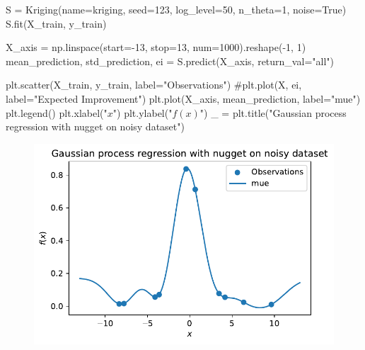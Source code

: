 \documentclass[
  letterpaper,
  DIV=11,
  numbers=noendperiod]{scrreprt}
\newenvironment{Shaded}{\begin{snugshade}}{\end{snugshade}}
\newcommand{\CommentTok}[1]{\textcolor[rgb]{0.37,0.37,0.37}{#1}}
\newcommand{\DecValTok}[1]{\textcolor[rgb]{0.68,0.00,0.00}{#1}}
\newcommand{\NormalTok}[1]{\textcolor[rgb]{0.00,0.23,0.31}{#1}}
\newcommand{\OperatorTok}[1]{\textcolor[rgb]{0.37,0.37,0.37}{#1}}
\newcommand{\StringTok}[1]{\textcolor[rgb]{0.13,0.47,0.30}{#1}}
\newcommand{\VariableTok}[1]{\textcolor[rgb]{0.07,0.07,0.07}{#1}}
\begin{document}
\begin{Shaded}
\begin{Highlighting}[]
\NormalTok{S }\OperatorTok{=}\NormalTok{ Kriging(name}\OperatorTok{=}\StringTok{\textquotesingle{}kriging\textquotesingle{}}\NormalTok{,}
\NormalTok{            seed}\OperatorTok{=}\DecValTok{123}\NormalTok{,}
\NormalTok{            log\_level}\OperatorTok{=}\DecValTok{50}\NormalTok{,}
\NormalTok{            n\_theta}\OperatorTok{=}\DecValTok{1}\NormalTok{,}
\NormalTok{            noise}\OperatorTok{=}\VariableTok{True}\NormalTok{)}
\NormalTok{S.fit(X\_train, y\_train)}

\NormalTok{X\_axis }\OperatorTok{=}\NormalTok{ np.linspace(start}\OperatorTok{={-}}\DecValTok{13}\NormalTok{, stop}\OperatorTok{=}\DecValTok{13}\NormalTok{, num}\OperatorTok{=}\DecValTok{1000}\NormalTok{).reshape(}\OperatorTok{{-}}\DecValTok{1}\NormalTok{, }\DecValTok{1}\NormalTok{)}
\NormalTok{mean\_prediction, std\_prediction, ei }\OperatorTok{=}\NormalTok{ S.predict(X\_axis, return\_val}\OperatorTok{=}\StringTok{"all"}\NormalTok{)}

\NormalTok{plt.scatter(X\_train, y\_train, label}\OperatorTok{=}\StringTok{"Observations"}\NormalTok{)}
\CommentTok{\#plt.plot(X, ei, label="Expected Improvement")}
\NormalTok{plt.plot(X\_axis, mean\_prediction, label}\OperatorTok{=}\StringTok{"mue"}\NormalTok{)}
\NormalTok{plt.legend()}
\NormalTok{plt.xlabel(}\StringTok{"$x$"}\NormalTok{)}
\NormalTok{plt.ylabel(}\StringTok{"$f(x)$"}\NormalTok{)}
\NormalTok{\_ }\OperatorTok{=}\NormalTok{ plt.title(}\StringTok{"Gaussian process regression with nugget on noisy dataset"}\NormalTok{)}
\end{Highlighting}
\end{Shaded}

\begin{figure}[H]

{\centering \includegraphics{07_spot_ei_files/figure-pdf/cell-57-output-1.pdf}

}

\end{figure}
\end{document}
